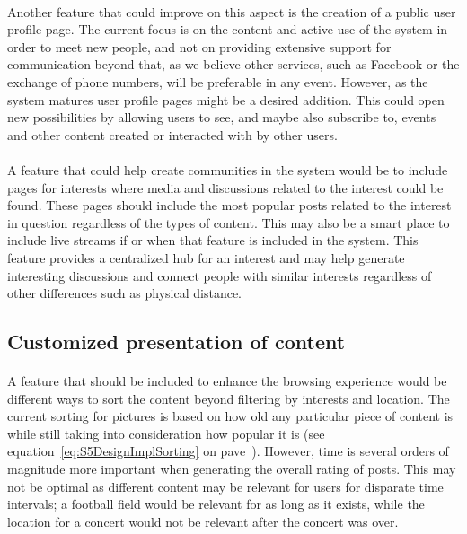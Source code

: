 \paragraph{} Another feature that could improve on this aspect is the creation of a public user profile page. The current focus is on the content and active use of the system in order to meet new people, and not on providing extensive support for communication beyond that, as we believe other services, such as Facebook or the exchange of phone numbers, will be preferable in any event. However, as the system matures user profile pages might be a desired addition. This could open new possibilities by allowing users to see, and maybe also subscribe to, events and other content created or interacted with by other users.
\paragraph{} A feature that could help create communities in the system would be to include pages for interests where media and discussions related to the interest could be found. These pages should include the most popular posts related to the interest in question regardless of the types of content. This may also be a smart place to include live streams if or when that feature is included in the system. This feature provides a centralized hub for an interest and may help generate interesting discussions and connect people with similar interests regardless of other differences such as physical distance. %

\subsection{Customized presentation of content}
\label{subsec:FurtherImprovementsCustomized}

\paragraph{} A feature that should be included to enhance the browsing experience would be different ways to sort the content beyond filtering by interests and location. The current sorting for pictures is based on how old any particular piece of content is while still taking into consideration how popular it is (see equation~\ref{eq:S5DesignImplSorting} on pave~\pageref{eq:S5DesignImplSorting}). However, time is several orders of magnitude more important when generating the overall rating of posts. This may not be optimal as different content may be relevant for users for disparate time intervals; a football field would be relevant for as long as it exists, while the location for a concert would not be relevant after the concert was over.
